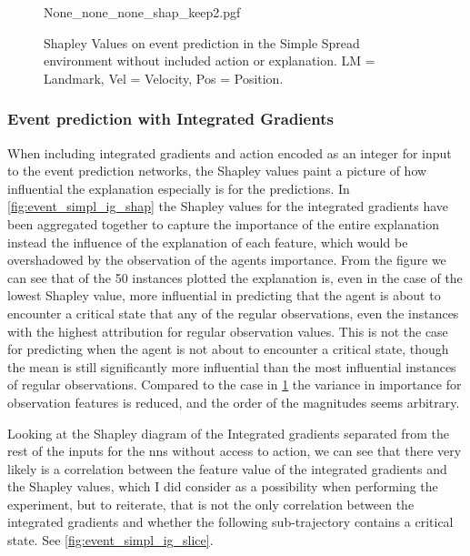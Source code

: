 \documentclass[UKenglish]{uiomasterthesis}
\begin{document}
\begin{figure}[hbtp]
\centering
{None_none_none_shap_keep2.pgf}
\caption{Shapley Values on event prediction in the Simple Spread environment without included action or explanation. LM = Landmark, Vel = Velocity, Pos = Position.}
\label{fig:event_simpl_shap}
\end{figure}

\subsubsection{Event prediction with Integrated Gradients}
When including integrated gradients and action encoded as an integer for input to the event prediction networks, the Shapley values paint a picture of how influential the explanation especially is for the predictions. In \cref{fig:event_simpl_ig_shap} the Shapley values for the integrated gradients have been aggregated together to capture the importance of the entire explanation instead the influence of the explanation of each feature, which would be overshadowed by the observation of the agents importance. From the figure we can see that of the 50 instances plotted the explanation is, even in the case of the lowest Shapley value, more influential in predicting that the agent is about to encounter a critical state that any of the regular observations, even the instances with the highest attribution for regular observation values. This is not the case for predicting when the agent is not about to encounter a critical state, though the mean is still significantly more influential than the most influential instances of regular observations. Compared to the case in \cref{fig:event_simpl_shap} the variance in importance for observation features is reduced, and the order of the magnitudes seems arbitrary.

Looking at the Shapley diagram of the Integrated gradients separated from the rest of the inputs for the \acp{nn} without access to action, we can see that there very likely is a correlation between the feature value of the integrated gradients and the Shapley values, which I did consider as a possibility when performing the experiment, but to reiterate, that is not the only correlation between the integrated gradients and whether the following sub-trajectory contains a critical state. See \cref{fig:event_simpl_ig_slice}.
\end{document}
